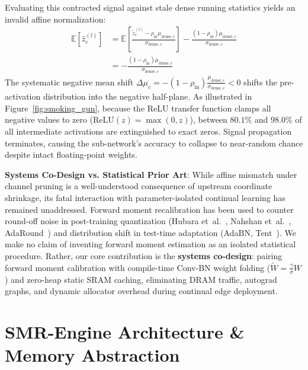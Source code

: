 \documentclass{article}
\begin{document}
Evaluating this contracted signal against stale dense running statistics yields an invalid affine normalization:
\begin{equation}
\label{eq:norm_shift}
\begin{aligned}
    \mathbb{E}\left[\hat{z}_c^{(l)}\right] &= \mathbb{E}\left[\frac{\tilde{z}_c^{(l)} - \rho_{\mathrm{in}} \mu_{\mathrm{dense}, c}}{\sigma_{\mathrm{dense}, c}}\right] - \frac{(1-\rho_{\mathrm{in}})\mu_{\mathrm{dense}, c}}{\sigma_{\mathrm{dense}, c}} \\
    &= -\frac{(1-\rho_{\mathrm{in}})\mu_{\mathrm{dense}, c}}{\sigma_{\mathrm{dense}, c}}
\end{aligned}
\end{equation}
The systematic negative mean shift $\Delta \mu_c = -(1-\rho_{\mathrm{in}})\frac{\mu_{\mathrm{dense}, c}}{\sigma_{\mathrm{dense}, c}} < 0$ shifts the pre-activation distribution into the negative half-plane. As illustrated in Figure~\ref{fig:smoking_gun}, because the ReLU transfer function clamps all negative values to zero ($\mathrm{ReLU}(z) = \max(0, z)$), between $80.1\%$ and $98.0\%$ of all intermediate activations are extinguished to exact zeros. Signal propagation terminates, causing the sub-network's accuracy to collapse to near-random chance despite intact floating-point weights.

\noindent\textbf{Systems Co-Design vs. Statistical Prior Art}: While affine mismatch under channel pruning is a well-understood consequence of upstream coordinate shrinkage, its fatal interaction with parameter-isolated continual learning has remained unaddressed. Forward moment recalibration has been used to counter round-off noise in post-training quantization (Hubara et~al.~\cite{hubara2021improving}, Nahshan et~al.~\cite{nahshan2021lossless}, AdaRound~\cite{nagel2020up}) and distribution shift in test-time adaptation (AdaBN, Tent~\cite{wang2021tent}). We make no claim of inventing forward moment estimation as an isolated statistical procedure. Rather, our core contribution is the \textbf{systems co-design}: pairing forward moment calibration with compile-time Conv-BN weight folding ($\tilde{W} = \frac{\gamma}{\sigma} W$) and zero-heap static SRAM caching, eliminating DRAM traffic, autograd graphs, and dynamic allocator overhead during continual edge deployment.

\section{SMR-Engine Architecture \& Memory Abstraction}
\label{sec:design}
\end{document}
